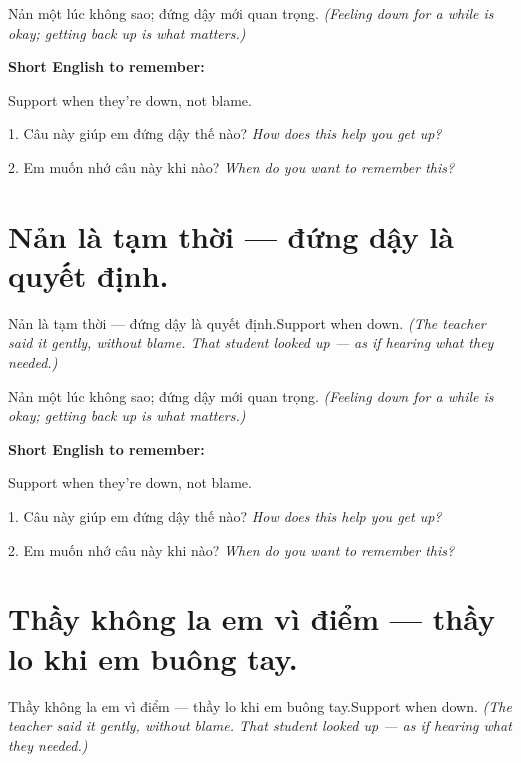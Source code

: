 \begin{baihoc}
Nản một lúc không sao; đứng dậy mới quan trọng.
\textit{(Feeling down for a while is okay; getting back up is what matters.)}
\end{baihoc}

\begin{ghinhoanh}
\textbf{Short English to remember:}

Support when they're down, not blame.

\end{ghinhoanh}

\begin{tuhocnhanh}
1. Câu này giúp em đứng dậy thế nào? \textit{How does this help you get up?}

2. Em muốn nhớ câu này khi nào? \textit{When do you want to remember this?}
\end{tuhocnhanh}
\ngancach


\section{Nản là tạm thời — đứng dậy là quyết định.}
\begin{truyen}{Nản là tạm thời — đứng dậy là quyết định.}{Support when down.}
\textit{(The teacher said it gently, without blame. That student looked up — as if hearing what they needed.)}
\end{truyen}

\begin{baihoc}
Nản một lúc không sao; đứng dậy mới quan trọng.
\textit{(Feeling down for a while is okay; getting back up is what matters.)}
\end{baihoc}

\begin{ghinhoanh}
\textbf{Short English to remember:}

Support when they're down, not blame.

\end{ghinhoanh}

\begin{tuhocnhanh}
1. Câu này giúp em đứng dậy thế nào? \textit{How does this help you get up?}

2. Em muốn nhớ câu này khi nào? \textit{When do you want to remember this?}
\end{tuhocnhanh}
\ngancach


\section{Thầy không la em vì điểm — thầy lo khi em buông tay.}
\begin{truyen}{Thầy không la em vì điểm — thầy lo khi em buông tay.}{Support when down.}
\textit{(The teacher said it gently, without blame. That student looked up — as if hearing what they needed.)}
\end{truyen}

